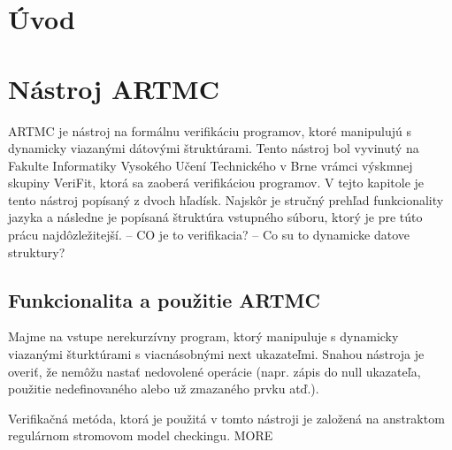 
\chapter{Úvod}

\chapter{Nástroj ARTMC}
ARTMC je nástroj na formálnu verifikáciu programov, ktoré manipulujú s
 dynamicky viazanými dátovými štruktúrami. Tento nástroj bol vyvinutý na Fakulte
 Informatiky Vysokého Učení Technického v Brne vrámci výskmnej skupiny VeriFit,
 ktorá sa zaoberá verifikáciou programov. V tejto kapitole je tento nástroj
 popísaný z dvoch hľadísk. Najskôr je stručný prehľad funkcionality jazyka a
 následne je popísaná štruktúra vstupného súboru, ktorý je pre túto prácu
 najdôzležitejší.
-- CO je to verifikacia?
-- Co su to dynamicke datove struktury?
 \section{Funkcionalita a použitie ARTMC}
 Majme na vstupe nerekurzívny program, ktorý manipuluje s dynamicky viazanými
 šturktúrami s viacnásobnými next ukazateľmi. Snahou nástroja je overiť, že
 nemôžu nastať nedovolené operácie (napr. zápis do null ukazateľa, použitie
 nedefinovaného alebo už zmazaného prvku atď.).

 Verifikačná metóda, ktorá je použitá v tomto nástroji je založená na anstraktom
 regulárnom stromovom model checkingu. MORE 

